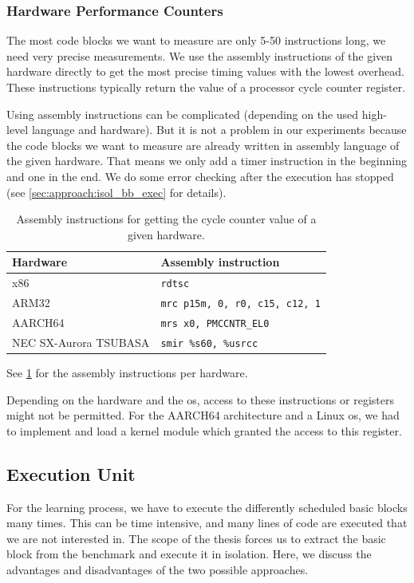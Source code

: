\subsubsection{Hardware Performance Counters}
\tobechecked
\label{sec:approach:hwpercounter}
The most code blocks we want to measure are only 5-50 instructions long, \ie we need very precise measurements.
We use the assembly instructions of the given hardware directly to get the most precise timing values with the lowest overhead.
These instructions typically return the value of a processor cycle counter register.

Using assembly instructions can be complicated (depending on the used high-level language and hardware).
But it is not a problem in our experiments because the code blocks we want to measure are already written in assembly language of the given hardware.
That means we only add a timer instruction in the beginning and one in the end.
We do some error checking after the execution has stopped (see \cref{sec:approach:isol_bb_exec} for details).
\begin{table}
    \centering
    \begin{tabular}{@{}ll@{}}
        \toprule
        Hardware & Assembly instruction \\
        \midrule
        x86 & \lstinline|rdtsc| \\
        ARM32 & \lstinline|mrc p15m, 0, r0, c15, c12, 1| \\
        AARCH64 & \lstinline|mrs x0, PMCCNTR_EL0| \\
        NEC SX-Aurora TSUBASA & \lstinline|smir %s60, %usrcc| \\
        \bottomrule
    \end{tabular}
    \caption{Assembly instructions for getting the cycle counter value of a given hardware.}
    \label{tab:approach:asm_instrs_timing}
\end{table}
See \cref{tab:approach:asm_instrs_timing} for the assembly instructions per hardware.

Depending on the hardware and the \ac{os}, access to these instructions or registers might not be permitted.
For the AARCH64 architecture and a Linux \ac{os}, we had to implement and load a kernel module which granted the access to this register.
 

\subsection{Execution Unit}
\label{sec:approach:exec_unit}
For the learning process, we have to execute the differently scheduled basic blocks many times.
This can be time intensive, and many lines of code are executed that we are not interested in.
The scope of the thesis forces us to extract the basic block from the benchmark and execute it in isolation.
Here, we discuss the advantages and disadvantages of the two possible approaches.

